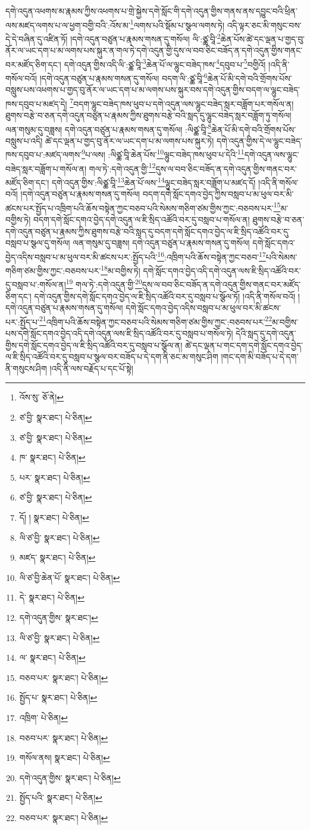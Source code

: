 དགེ་འདུན་འཕགས་མ་རྣམས་ཀྱིས་འཕགས་པ་གྲེ་སྐྱེས་དགེ་སློང་གི་དགེ་འདུན་གྱིས་གནས་ནས་དབྱུང་བའི་ཕྲིན་ལས་མཛད་ལགས་པ་ལ་ཕྱག་བགྱི་བའི་:འོས་མ་\footnote{འོས་སུ་  ཅོ་ནེ། }ལགས་པའི་སྡོམ་པ་སྩལ་ལགས་ཏེ། འདི་ལྟར་ཅང་མི་གསུང་བས་དེ་དེ་བཞིན་དུ་འཛིན་ཏོ། །དགེ་འདུན་བཙུན་པ་རྣམས་གསན་དུ་གསོལ། ལི་:ཙྪ་བཱི་\footnote{ཙ་བྱི་  སྣར་ཐང་།  པེ་ཅིན། }ཆེན་པོས་ཚེ་དང་ལྡན་པ་གྱད་བུ་ནོར་ལ་ཡང་དག་པ་མ་ལགས་པས་སྐུར་ན་གལ་ཏེ་དགེ་འདུན་གྱི་དུས་ལ་བབ་ཅིང་བཟོད་ན་དགེ་འདུན་གྱིས་གནང་བར་མཛོད་ཅིག་དང་། དགེ་འདུན་གྱིས་འདི་ལི་:ཙྪ་བཱི་\footnote{ཙ་བྱི་  སྣར་ཐང་།  པེ་ཅིན། }ཆེན་པོ་ལ་ལྷུང་བཟེད་ཁས་\footnote{ཁ་  སྣར་ཐང་།  པེ་ཅིན། }དབུབ་པ་\footnote{པར་  སྣར་ཐང་།  པེ་ཅིན། }བགྱིའོ། །འདི་ནི་གསོལ་བའོ། །དགེ་འདུན་བཙུན་པ་རྣམས་གསན་དུ་གསོལ། བདག་ལི་:ཙྪ་བཱི་\footnote{ཙ་བྱི་  སྣར་ཐང་།  པེ་ཅིན། }ཆེན་པོ་མི་དགེ་བའི་གྲོགས་པོས་བསླུས་པས་འཕགས་པ་གྱད་བུ་ནོར་ལ་ཡང་དག་པ་མ་ལགས་པས་སྐུར་བས་དགེ་འདུན་གྱིས་བདག་ལ་ལྷུང་བཟེད་ཁས་དབུབ་པ་མཛད་དེ། \footnote{དོ། །   སྣར་ཐང་།  པེ་ཅིན། }བདག་ལྷུང་བཟེད་ཁས་ཕུབ་པ་དགེ་འདུན་ལས་ལྷུང་བཟེད་སླར་བཟློག་པར་གསོལ་ན། ཐུགས་བརྩེ་བ་ཅན་དགེ་འདུན་བཙུན་པ་རྣམས་ཀྱིས་ཐུགས་བརྩེ་བའི་སླད་དུ་ལྷུང་བཟེད་སླར་བཟློག་ཏུ་གསོལ། ལན་གསུམ་དུ་བཟླས། དགེ་འདུན་བཙུན་པ་རྣམས་གསན་དུ་གསོལ། :ལིཙྪ་བཱི་\footnote{ལི་ཙ་བྱི་  སྣར་ཐང་།  པེ་ཅིན། }ཆེན་པོ་མི་དགེ་བའི་གྲོགས་པོས་བསླུས་པ་འདི། ཚེ་དང་ལྡན་པ་གྱད་བུ་ནོར་ལ་ཡང་དག་པ་མ་ལགས་པས་སྐུར་ཏེ། དགེ་འདུན་གྱིས་དེ་ལ་ལྷུང་བཟེད་ཁས་དབུབ་པ་:མཛད་ལགས་\footnote{མཛད་  སྣར་ཐང་།  པེ་ཅིན། }པ་ལས། :ལིཙྪ་བཱི་ཆེན་པོས་\footnote{ལི་ཙ་བྱི་ཆེན་པོ་  སྣར་ཐང་།  པེ་ཅིན། }ལྷུང་བཟེད་ཁས་ཕུབ་པ་དེའི་\footnote{དེ་  སྣར་ཐང་།  པེ་ཅིན། }དགེ་འདུན་ལས་ལྷུང་བཟེད་སླར་བཟློག་པ་གསོལ་ན། གལ་ཏེ་:དགེ་འདུན་གྱི་\footnote{དགེ་འདུན་གྱིས་  སྣར་ཐང་། }དུས་ལ་བབ་ཅིང་བཟོད་ན་དགེ་འདུན་གྱིས་གནང་བར་མཛོད་ཅིག་དང་། དགེ་འདུན་གྱིས་:ལིཙྪ་བཱི་\footnote{ལི་ཙ་བྱི་  སྣར་ཐང་།  པེ་ཅིན། }ཆེན་པོ་ལས་\footnote{ལ་  སྣར་ཐང་།  པེ་ཅིན། }ལྷུང་བཟེད་སླར་བཟློག་པ་མཛད་དོ། །འདི་ནི་གསོལ་བའོ། །དགེ་འདུན་བཙུན་པ་རྣམས་གསན་དུ་གསོལ། བདག་དགེ་སློང་དགའ་བྱེད་ཀྱིས་བསླབ་པ་མ་ཕུལ་བར་མི་ཚངས་པར་སྤྱོད་པ་འཁྲིག་པའི་ཆོས་བསྟེན་ཀྱང་བཅབ་པའི་སེམས་གཅིག་ཙམ་གྱིས་ཀྱང་:བཅབས་པར་\footnote{བཅབ་པར་  སྣར་ཐང་།  པེ་ཅིན། }མ་བགྱིས་ཏེ། བདག་དགེ་སློང་དགའ་བྱེད་དགེ་འདུན་ལ་ཇི་སྲིད་འཚོའི་བར་དུ་བསླབ་པ་གསོལ་ན། ཐུགས་བརྩེ་བ་ཅན་དགེ་འདུན་བཙུན་པ་རྣམས་ཀྱིས་ཐུགས་བརྩེ་བའི་སླད་དུ་བདག་དགེ་སློང་དགའ་བྱེད་ལ་ཇི་སྲིད་འཚོའི་བར་དུ་བསླབ་པ་སྩལ་དུ་གསོལ། ལན་གསུམ་དུ་བཟླས། དགེ་འདུན་བཙུན་པ་རྣམས་གསན་དུ་གསོལ། དགེ་སློང་དགའ་བྱེད་འདིས་བསླབ་པ་མ་ཕུལ་བར་མི་ཚངས་པར་:སྤྱོད་པའི་\footnote{སྤྱོད་པ་  སྣར་ཐང་།  པེ་ཅིན། }:འཁྲིག་པའི་ཆོས་བསྟེན་ཀྱང་བཅབ་\footnote{འཁྲིག་  པེ་ཅིན། }པའི་སེམས་གཅིག་ཙམ་གྱིས་ཀྱང་:བཅབས་པར་\footnote{བཅབ་པར་  སྣར་ཐང་།  པེ་ཅིན། }མ་བགྱིས་ཏེ། དགེ་སློང་དགའ་བྱེད་འདི་དགེ་འདུན་ལས་ཇི་སྲིད་འཚོའི་བར་དུ་བསླབ་པ་:གསོལ་ན།\footnote{གསོལ་ནས།  སྣར་ཐང་།  པེ་ཅིན། } གལ་ཏེ་:དགེ་འདུན་གྱི་\footnote{དགེ་འདུན་གྱིས་  སྣར་ཐང་།  པེ་ཅིན། }དུས་ལ་བབ་ཅིང་བཟོད་ན་དགེ་འདུན་གྱིས་གནང་བར་མཛོད་ཅིག་དང་། དགེ་འདུན་གྱིས་དགེ་སློང་དགའ་བྱེད་ལ་ཇི་སྲིད་འཚོའི་བར་དུ་བསླབ་པ་སྩོལ་ཏོ། །འདི་ནི་གསོལ་བའོ། །དགེ་འདུན་བཙུན་པ་རྣམས་གསན་དུ་གསོལ། དགེ་སློང་དགའ་བྱེད་འདིས་བསླབ་པ་མ་ཕུལ་བར་མི་ཚངས་པར་:སྤྱོད་པ་\footnote{སྤྱོད་པའི་  སྣར་ཐང་།  པེ་ཅིན། }འཁྲིག་པའི་ཆོས་བསྟེན་ཀྱང་བཅབ་པའི་སེམས་གཅིག་ཙམ་གྱིས་ཀྱང་:བཅབས་པར་\footnote{བཅབ་པར་  སྣར་ཐང་།  པེ་ཅིན། }མ་བགྱིས་པས་དགེ་སློང་དགའ་བྱེད་འདི་དགེ་འདུན་ལས་ཇི་སྲིད་འཚོའི་བར་དུ་བསླབ་པ་གསོལ་ཏེ། དེའི་སླད་དུ་དགེ་འདུན་གྱིས་དགེ་སློང་དགའ་བྱེད་ལ་ཇི་སྲིད་འཚོའི་བར་དུ་བསླབ་པ་སྩོལ་ན། ཚེ་དང་ལྡན་པ་གང་དག་དགེ་སློང་དགའ་བྱེད་ལ་ཇི་སྲིད་འཚོའི་བར་དུ་བསླབ་པ་སྩལ་བར་བཟོད་པ་དེ་དག་ནི་ཅང་མ་གསུང་ཤིག །གང་དག་མི་བཟོད་པ་དེ་དག་ནི་གསུངས་ཤིག །འདི་ནི་ལས་བརྗོད་པ་དང་པོ་སྟེ། 